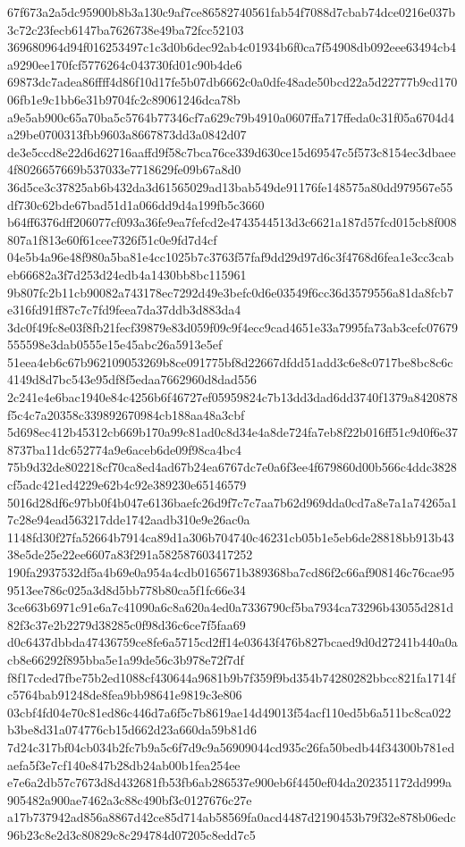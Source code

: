 \documentclass[11pt,a4paper]{article}
\begin{document}
{67f673a2a5dc95900b8b3a130c9af7ce86582740561fab54f7088d7cbab74dce0216e037b3c72c23fecb6147ba7626738e49ba72fcc52103
369680964d94f016253497c1c3d0b6dec92ab4c01934b6f0ca7f54908db092eee63494cb4a9290ee170fcf5776264c043730fd01c90b4de6
69873dc7adea86ffff4d86f10d17fe5b07db6662c0a0dfe48ade50bcd22a5d22777b9cd17006fb1e9c1bb6e31b9704fc2c89061246dca78b
a9e5ab900c65a70ba5c5764b77346cf7a629c79b4910a0607ffa717ffeda0c31f05a6704d4a29be0700313fbb9603a8667873dd3a0842d07
de3e5ccd8e22d6d62716aaffd9f58c7bca76ce339d630ce15d69547c5f573c8154ec3dbaee4f8026657669b537033e7718629fe09b67a8d0
36d5ce3c37825ab6b432da3d61565029ad13bab549de91176fe148575a80dd979567e55df730c62bde67bad51d1a066dd9d4a199fb5c3660
b64ff6376dff206077cf093a36fe9ea7fefcd2e4743544513d3c6621a187d57fcd015cb8f008807a1f813e60f61cee7326f51c0e9fd7d4cf
04e5b4a96e48f980a5ba81e4cc1025b7c3763f57faf9dd29d97d6c3f4768d6fea1e3cc3cabeb66682a3f7d253d24edb4a1430bb8bc115961
9b807fc2b11cb90082a743178ec7292d49e3befc0d6e03549f6cc36d3579556a81da8fcb7e316fd91ff87c7c7fd9feea7da37ddb3d883da4
3dc0f49fc8e03f8fb21fecf39879e83d059f09c9f4ecc9cad4651e33a7995fa73ab3cefc07679555598e3dab0555e15e45abc26a5913e5ef
51eea4eb6c67b962109053269b8ce091775bf8d22667dfdd51add3c6e8c0717be8bc8c6c4149d8d7bc543e95df8f5edaa7662960d8dad556
2c241e4e6bac1940e84c4256b6f46727ef05959824c7b13dd3dad6dd3740f1379a8420878f5c4c7a20358c339892670984cb188aa48a3cbf
5d698ec412b45312cb669b170a99c81ad0c8d34e4a8de724fa7eb8f22b016ff51c9d0f6e378737ba11dc652774a9e6aceb6de09f98ca4bc4
75b9d32de802218cf70ca8ed4ad67b24ea6767dc7e0a6f3ee4f679860d00b566c4ddc3828cf5adc421ed4229e62b4c92e389230e65146579
5016d28df6c97bb0f4b047e6136baefc26d9f7c7c7aa7b62d969dda0cd7a8e7a1a74265a17c28e94ead563217dde1742aadb310e9e26ac0a
1148fd30f27fa52664b7914ca89d1a306b704740c46231cb05b1e5eb6de28818bb913b4338e5de25e22ee6607a83f291a582587603417252
190fa2937532df5a4b69e0a954a4cdb0165671b389368ba7cd86f2c66af908146c76cae959513ee786c025a3d8d5bb778b80ca5f1fc66e34
3ce663b6971c91e6a7c41090a6c8a620a4ed0a7336790cf5ba7934ca73296b43055d281d82f3c37e2b2279d38285c0f98d36c6ce7f5faa69
d0c6437dbbda47436759ce8fe6a5715cd2ff14e03643f476b827bcaed9d0d27241b440a0acb8e66292f895bba5e1a99de56c3b978e72f7df
f8f17cded7fbe75b2ed1088cf430644a9681b9b7f359f9bd354b74280282bbcc821fa1714fc5764bab91248de8fea9bb98641e9819c3e806
03cbf4fd04e70c81ed86c446d7a6f5c7b8619ae14d49013f54acf110ed5b6a511bc8ca022b3be8d31a074776cb15d662d23a660da59b81d6
7d24c317bf04cb034b2fc7b9a5c6f7d9c9a56909044cd935c26fa50bedb44f34300b781edaefa5f3e7cf140e847b28db24ab00b1fea254ee
e7e6a2db57c7673d8d432681fb53fb6ab286537e900eb6f4450ef04da202351172dd999a905482a900ae7462a3c88c490bf3c0127676c27e
a17b737942ad856a8867d42ce85d714ab58569fa0acd4487d2190453b79f32e878b06edc96b23c8e2d3c80829c8c294784d07205c8edd7c5
}
\end{document}
